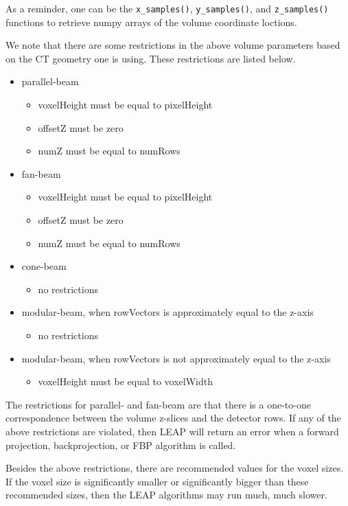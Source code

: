 \documentclass[11pt]{article}
\begin{document}
As a reminder, one can be the \texttt{x\_samples()}, \texttt{y\_samples()}, and \texttt{z\_samples()} functions to retrieve numpy arrays of the volume coordinate loctions.

We note that there are some restrictions in the above volume parameters based on the CT geometry one is using.  These restrictions are listed below.
\begin{itemize}
\item parallel-beam
    \begin{itemize}
    \item voxelHeight must be equal to pixelHeight
    \item offsetZ must be zero
    \item numZ must be equal to numRows
    \end{itemize}
\item fan-beam
    \begin{itemize}
    \item voxelHeight must be equal to pixelHeight
    \item offsetZ must be zero
    \item numZ must be equal to numRows
    \end{itemize}
\item cone-beam
    \begin{itemize}
    \item no restrictions
    \end{itemize}
\item modular-beam, when rowVectors is approximately equal to the z-axis
    \begin{itemize}
    \item no restrictions
    \end{itemize}
\item modular-beam, when rowVectors is not approximately equal to the z-axis
    \begin{itemize}
    \item voxelHeight must be equal to voxelWidth
    \end{itemize}
\end{itemize}
The restrictions for parallel- and fan-beam are that there is a one-to-one correspondence between the volume z-slices and the detector rows.  If any of the above restrictions are violated, then LEAP will return an error when a forward projection, backprojection, or FBP algorithm is called.

Besides the above restrictions, there are recommended values for the voxel sizes.  If the voxel size is significantly smaller or significantly bigger than these recommended sizes, then the LEAP algorithms may run much, much slower.
\end{document}
